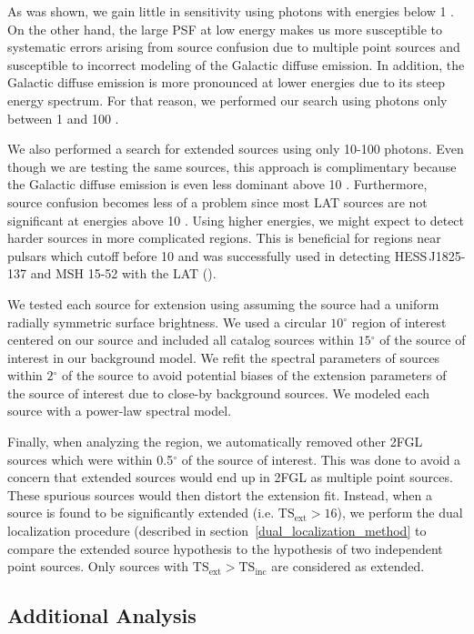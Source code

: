 \documentclass[12pt,preprint]{aastex}
\newcommand{\gev}{\text{GeV}\xspace}
\newcommand{\tsext}{{\ensuremath{\text{TS}_{\text{ext}}}}\xspace}
\newcommand{\tsinc}{\ensuremath{\text{TS}_{\text{inc}}}\xspace}
\renewcommand{\deg}{\ensuremath{^\circ}\xspace}
\newcommand{\pointlike}{\text{\em pointlike}\xspace}
\begin{document}
As was shown, we gain little in sensitivity using photons with energies
below 1 \gev. On the other hand, the large PSF at low energy makes us
more susceptible to systematic errors arising from source confusion due
to multiple point sources and susceptible to incorrect modeling of the
Galactic diffuse emission. In addition, the Galactic diffuse emission
is more pronounced at lower energies due to its steep energy spectrum.
For that reason, we performed our search using photons only between 1
\gev and 100 \gev. 

We also performed a search for extended sources using only 10-100 \gev photons. 
Even though we are testing the same
sources, this approach is complimentary because the Galactic diffuse
emission is even less dominant above 10 \gev. Furthermore, source
confusion becomes less of a problem since most LAT sources are not
significant at energies above 10 \gev.  Using higher energies, we might
expect to detect harder sources in more complicated regions. This is
beneficial for regions near pulsars which cutoff before 10 \gev and was
successfully used in detecting HESS\,J1825-137 and MSH 15-52 with the LAT
(\cite{msh1552,fermi_hess_j1825}).

We tested each source for extension using
\pointlike
assuming the source had a uniform radially symmetric surface brightness.
We used a circular $10\deg$ region of interest centered on our source and
included all catalog sources within $15\deg$ of the source of interest
in our background model.
We refit the spectral parameters of sources within $2\deg$ of the source
to avoid potential biases of the extension parameters of the source of
interest due to close-by background sources.
We modeled each source with a power-law spectral model. 

Finally, when analyzing the region, we automatically removed other 2FGL
sources which were within 0.5\deg of the source of interest. This was
done to avoid a concern that extended sources would end up in 2FGL as
multiple point sources. These spurious sources would then distort the
extension fit.  Instead, when a source is found to be significantly
extended (i.e. $\tsext>16$), we perform the dual localization procedure
(described in section~\ref{dual_localization_method} to compare the
extended source hypothesis to the hypothesis of two independent point
sources. Only sources with $\tsext>\tsinc$ are considered as extended.

\subsection{Additional Analysis}
\end{document}

